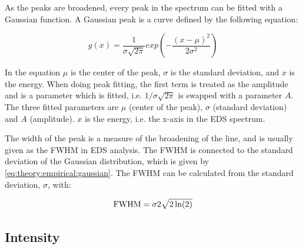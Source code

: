 As the peaks are broadened, every peak in the spectrum can be fitted with a Gaussian function.
A Gaussian peak is a curve defined by the following equation:

\begin{equation}
    \label{eq:theory:empirical:gaussian}
    g(x) = \frac{1}{\sigma \sqrt{2\pi}} exp({-\frac{(x-\mu)^2}{2\sigma^2}})
\end{equation}

In the equation $\mu$ is the center of the peak, $\sigma$ is the standard deviation, and $x$ is the energy.
When doing peak fitting, the first term is treated as the amplitude and is a parameter which is fitted, i.e. $1/\sigma\sqrt{2\pi}$ is swapped with a parameter $A$.
The three fitted parameters are $\mu$ (center of the peak), $\sigma$ (standard deviation) and $A$ (amplitude).
$x$ is the energy, i.e. the x-axis in the EDS spectrum.

The width of the peak is a measure of the broadening of the line, and is usually given as the FWHM in EDS analysis. The FWHM is connected to the standard deviation of the Gaussian distribution, which is given by \cref{eq:theory:empirical:gaussian}.
The FWHM can be calculated from the standard deviation, $\sigma$, with:

\begin{equation}
    \label{eq:theory:empirical:peaks:FWHM}
    \textnormal{FWHM} = {\sigma}{2\sqrt{2\ln(2)}}
\end{equation}


%
% 
\subsection{Intensity}
\label{sec:theory:empirical:intensity}



